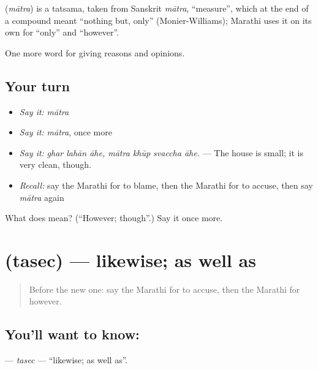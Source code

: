 \begin{cousinweb}
\textbf{} (\emph{mātra}) is a tatsama, taken from Sanskrit \emph{mātra}, \textquotedblleft{}measure\textquotedblright{}, which at the end of a compound meant \textquotedblleft{}nothing but, only\textquotedblright{} (Monier-Williams); Marathi uses it on its own for \textquotedblleft{}only\textquotedblright{} and \textquotedblleft{}however\textquotedblright{}.
\end{cousinweb}

\begin{grammarlens}[title={What you've built}]
One more word for giving reasons and opinions.
\end{grammarlens}

\subsection*{Your turn}
\begin{itemize}
\raggedright
  \item \emph{Say it:} \emph{mātra}
  \item \emph{Say it:} \emph{mātra}, once more
  \item \emph{Say it:} \emph{ghar lahān āhe, mātra khūp svaccha āhe.} — The house is small; it is very clean, though.
  \item \emph{Recall:} say the Marathi for to blame, then the Marathi for to accuse, then say \emph{mātra} again
\end{itemize}

\begin{tcolorbox}[breakable,colback=teal!4,colframe=teal!35!black,title={Before you move on}]
What does  mean? (\textquotedblleft{}However; though\textquotedblright{}.) Say it once more.
\end{tcolorbox}
\section[\texorpdfstring{\mr{तसेच} (tasec)}{तसेच (tasec)}]{ (tasec) — likewise; as well as}

\label{lesson:MR-C351-tasec}



\begin{quote}
Before the new one: say the Marathi for to accuse, then the Marathi for however.
\end{quote}

\subsection*{You'll want to know: }
\textbf{} — \emph{tasec} — \textquotedblleft{}likewise; as well as\textquotedblright{}.

